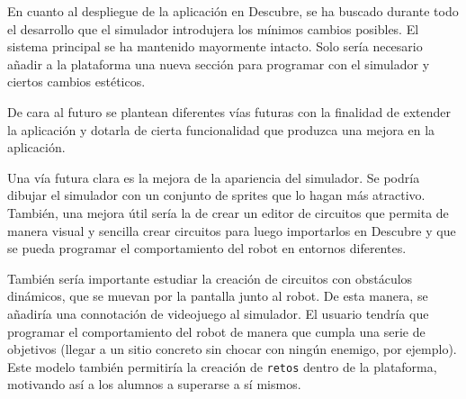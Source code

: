 En cuanto al despliegue de la aplicación en Descubre, se ha buscado durante todo el desarrollo que el simulador introdujera los mínimos cambios posibles. El sistema principal se ha mantenido mayormente intacto. Solo sería necesario añadir a la plataforma una nueva sección para programar con el simulador y ciertos cambios estéticos.



De cara al futuro se plantean diferentes vías futuras con la finalidad de extender la aplicación y dotarla de cierta funcionalidad que produzca una mejora en la aplicación.

Una vía futura clara es la mejora de la apariencia del simulador. Se podría dibujar el simulador con un conjunto de sprites que lo hagan más atractivo. También, una mejora útil sería la de crear un editor de circuitos que permita de manera visual y sencilla crear circuitos para luego importarlos en Descubre y que se pueda programar el comportamiento del robot en entornos diferentes. 

También sería importante estudiar la creación de circuitos con obstáculos dinámicos, que se muevan por la pantalla junto al robot. De esta manera, se añadiría una connotación de videojuego al simulador. El usuario tendría que programar el comportamiento del robot de manera que cumpla una serie de objetivos (llegar a un sitio concreto sin chocar con ningún enemigo, por ejemplo). Este modelo también permitiría la creación de \texttt{retos} dentro de la plataforma, motivando así a los alumnos a superarse a sí mismos.





